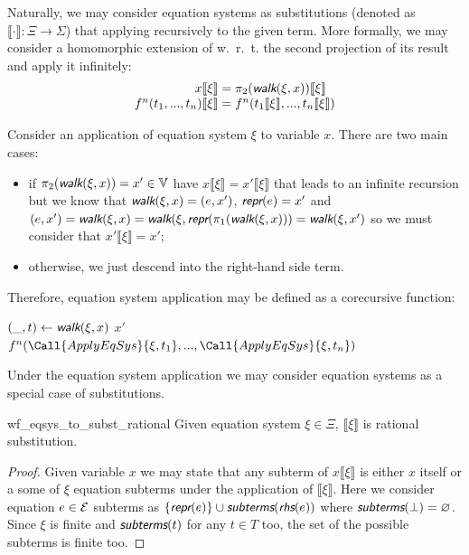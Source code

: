 Naturally, we may consider equation systems as substitutions (denoted as $\llbracket \cdot \rrbracket : \Xi \rightarrow \Sigma$) that applying recursively to the given term. More formally, we may consider a homomorphic extension of \walk w.~r.~t. the second projection of its result and apply it infinitely:
\begin{equation*}
    \begin{array}{r@{{}={}}l}
        x \llbracket\xi\rrbracket & \pi_2(\walk(\xi, x)) \llbracket\xi\rrbracket \\
        f^n(t_1, ..., t_n) \llbracket\xi\rrbracket & f^n(t_1 \llbracket\xi\rrbracket, ..., t_n \llbracket\xi\rrbracket) \\
    \end{array}
\end{equation*}

Consider an application of equation system $\xi$ to variable $x$. There are two main cases:
\begin{itemize}
    \item if $\pi_2(\walk(\xi, x)) = x' \in \V$ have $x \llbracket\xi\rrbracket = x' \llbracket\xi\rrbracket$ that leads to an infinite recursion but we know that $\walk(\xi, x) = (e, x')$, $\repr(e) = x'$ and $(e, x') = \walk(\xi, x) = \walk(\xi, \repr(\pi_1(\walk(\xi, x))) = \walk(\xi, x')$ so we must consider that $x' \llbracket\xi\rrbracket = x'$;
    \item otherwise, we just descend into the right-hand side term.
\end{itemize}

Therefore, equation system application may be defined as a corecursive function:
\begin{algorithmic}
            \State $(\_, t) \gets \walk(\xi, x)$
        \EndIf
            \State \Return $x'$
            \State \Return $f^n(\Call{ApplyEqSys}{\xi, t_1}, ..., \Call{ApplyEqSys}{\xi, t_n})$
        \EndIf
    \EndFunction
\end{algorithmic}

Under the equation system application we may consider equation systems as a special case of substitutions.

\begin{rocqtheorem}{wf_eqsys_to_subst_rational}
    Given equation system $\xi \in \Xi$, $\llbracket\xi\rrbracket$ is rational substitution.
\end{rocqtheorem}
\begin{proof}
    Given variable $x$ we may state that any subterm of $x \llbracket\xi\rrbracket$ is either $x$ itself or a some of $\xi$ equation subterms under the application of $\llbracket\xi\rrbracket$. Here we consider equation $e \in \mathcal{E}$ subterms as $\{ \repr(e) \} \cup \subterms(\rhs(e))$ where $\subterms(\bot) = \emptyset$. Since $\xi$ is finite and $\subterms(t)$ for any $t \in T$ too, the set of the possible subterms is finite too.
\end{proof}

